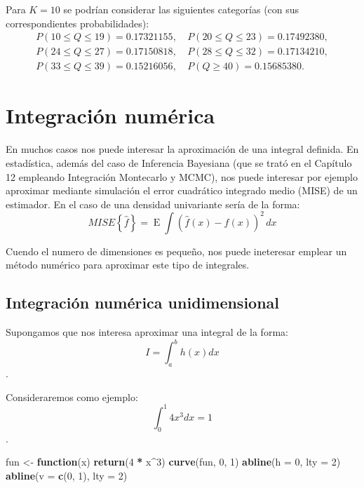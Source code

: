\documentclass[
]{book}
\newenvironment{Shaded}{\begin{snugshade}}{\end{snugshade}}
\newcommand{\ControlFlowTok}[1]{\textcolor[rgb]{0.13,0.29,0.53}{\textbf{#1}}}
\newcommand{\DataTypeTok}[1]{\textcolor[rgb]{0.13,0.29,0.53}{#1}}
\newcommand{\DecValTok}[1]{\textcolor[rgb]{0.00,0.00,0.81}{#1}}
\newcommand{\KeywordTok}[1]{\textcolor[rgb]{0.13,0.29,0.53}{\textbf{#1}}}
\newcommand{\NormalTok}[1]{#1}
\newcommand{\OperatorTok}[1]{\textcolor[rgb]{0.81,0.36,0.00}{\textbf{#1}}}
\newcommand{\StringTok}[1]{\textcolor[rgb]{0.31,0.60,0.02}{#1}}
\theoremstyle{break}
\theoremstyle{definition}
\theoremstyle{definition}
\theoremstyle{definition}
\theoremstyle{remark}
\begin{document}
Para \(K=10\) se podrían considerar las siguientes categorías (con sus correspondientes probabilidades):
\[\begin{array}{rr}
P( 10 \leq Q \leq 19 ) = 0.17321155, \ & P( 20 \leq Q \leq 23 ) = 0.17492380,\\
P( 24 \leq Q \leq 27 ) = 0.17150818, \ & P( 28 \leq Q \leq 32 ) = 0.17134210,\\
P( 33 \leq Q \leq 39 ) = 0.15216056, \ & P( Q \geq 40 ) =0.15685380.
\end{array}\]

\hypertarget{integraciuxf3n-numuxe9rica}{%
\chapter{Integración numérica}\label{integraciuxf3n-numuxe9rica}}

En muchos casos nos puede interesar la aproximación de una integral definida.
En estadística, además del caso de Inferencia Bayesiana (que se trató en el Capítulo 12
empleando Integración Montecarlo y MCMC), nos puede interesar por ejemplo aproximar mediante
simulación el error cuadrático integrado medio (MISE) de un estimador.
En el caso de una densidad univariante sería de la forma:
\[MISE \left\{ \hat{f} \right\} = \operatorname{E}\int (\hat{f}(x)-f(x))^2 \, dx\]

Cuendo el numero de dimensiones es pequeño, nos puede ineteresar emplear un método numérico
para aproximar este tipo de integrales.

\hypertarget{integraciuxf3n-numuxe9rica-unidimensional}{%
\section{Integración numérica unidimensional}\label{integraciuxf3n-numuxe9rica-unidimensional}}

Supongamos que nos interesa aproximar una integral de la forma:
\[I=\int_{a}^{b}h\left(  x\right)dx\].

Consideraremos como ejemplo:
\[\int_{0}^{1}4x^{3}dx=1\].

\begin{Shaded}
\begin{Highlighting}[]
\NormalTok{fun <-}\StringTok{ }\ControlFlowTok{function}\NormalTok{(x) }\KeywordTok{return}\NormalTok{(}\DecValTok{4} \OperatorTok{*}\StringTok{ }\NormalTok{x}\OperatorTok{^}\DecValTok{3}\NormalTok{)}
\KeywordTok{curve}\NormalTok{(fun, }\DecValTok{0}\NormalTok{, }\DecValTok{1}\NormalTok{)}
\KeywordTok{abline}\NormalTok{(}\DataTypeTok{h =} \DecValTok{0}\NormalTok{, }\DataTypeTok{lty =} \DecValTok{2}\NormalTok{)}
\KeywordTok{abline}\NormalTok{(}\DataTypeTok{v =} \KeywordTok{c}\NormalTok{(}\DecValTok{0}\NormalTok{, }\DecValTok{1}\NormalTok{), }\DataTypeTok{lty =} \DecValTok{2}\NormalTok{)}
\end{Highlighting}
\end{Shaded}
\end{document}
